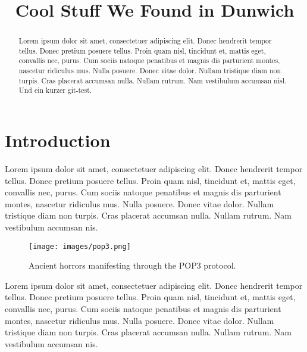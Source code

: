 \documentclass[conference]{IEEEtran}
\begin{document}
\title{Cool Stuff We Found in Dunwich}

\author{
\and
{}
}

\maketitle

\begin{abstract}
Lorem ipsum dolor sit amet, consectetuer adipiscing \cite{foo-bar-86} elit. Donec hendrerit tempor tellus. Donec pretium posuere tellus. Proin quam nisl, tincidunt et, mattis eget, convallis nec, purus. Cum sociis natoque penatibus et magnis dis parturient montes, nascetur ridiculus mus. Nulla posuere. Donec vitae dolor. Nullam tristique diam non turpis. Cras placerat accumsan nulla. Nullam rutrum. Nam vestibulum accumsan nisl. Und ein kurzer git-test.
\end{abstract}

\section{Introduction}

Lorem ipsum dolor sit amet, consectetuer adipiscing elit. Donec hendrerit tempor tellus. Donec pretium posuere tellus. Proin quam nisl, tincidunt et, mattis eget, convallis nec, purus. Cum sociis natoque penatibus et magnis dis parturient montes, nascetur ridiculus mus. Nulla posuere. Donec vitae dolor. Nullam tristique diam non turpis. Cras placerat accumsan nulla. Nullam rutrum. Nam vestibulum accumsan nis.

\begin{figure}[h]
  \centering
  \texttt{[image: images/pop3.png]}
  \caption{Ancient horrors manifesting through the POP3 protocol.}
  \label{fig:how_pop3_works}
\end{figure}

Lorem ipsum dolor sit amet, consectetuer adipiscing elit. Donec hendrerit tempor tellus. Donec pretium posuere tellus. Proin quam nisl, tincidunt et, mattis eget, convallis nec, purus. Cum sociis natoque penatibus et magnis dis parturient montes, nascetur ridiculus mus. Nulla posuere. Donec vitae dolor. Nullam tristique diam non turpis. Cras placerat accumsan nulla. Nullam rutrum. Nam vestibulum accumsan nis.
\end{document}
